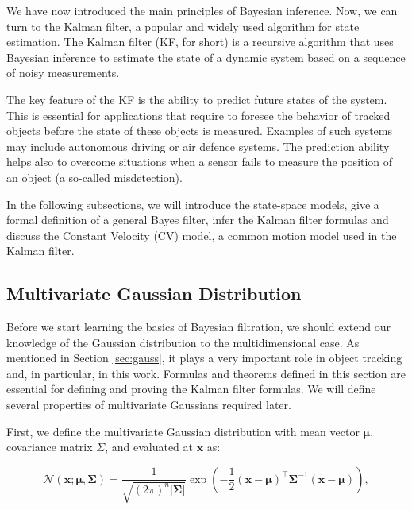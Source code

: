 
We have now introduced the main principles of Bayesian inference. Now, we can
turn to the Kalman filter, a popular and widely used algorithm for state 
estimation. The Kalman filter (KF, for short) is a recursive algorithm that uses
Bayesian inference to estimate the state of a dynamic system based on a sequence
of noisy measurements.

The key feature of the KF is the ability to predict future states of the system.
This is essential for applications that require to foresee the behavior of
tracked objects before the state of these objects is measured. Examples of such
systems may include autonomous driving or air defence systems. The prediction 
ability helps also to overcome situations when a sensor fails to measure the
position of an object (a so-called misdetection).

In the following subsections, we will introduce the state-space models, give
a formal definition of a general Bayes filter, infer the Kalman filter formulas
and discuss the Constant Velocity (CV) model, a common motion model used in the
Kalman filter.

\subsection{Multivariate Gaussian Distribution}

Before we start learning the basics of Bayesian filtration, we should extend our knowledge of the Gaussian distribution to the multidimensional case. As mentioned in Section \ref{sec:gauss}, it plays a very important role in object tracking and, in particular, in this work. Formulas and theorems defined in this section are essential for defining and proving the Kalman filter formulas. We will define several properties of multivariate Gaussians required later.

First, we define the multivariate Gaussian distribution with mean vector $\boldsymbol\mu$, covariance matrix $\Sigma$, and evaluated at $\mathbf{x}$ as:

\begin{equation}\label{eq:vec-gauss-def}
    \mathscr{N}\left(\mathbf{x} ; \mathbf\mu, \mathbf\Sigma\right)
    = \frac{1}{\sqrt{(2\pi)^n|\mathbf{\Sigma}|}}\exp\left(-\frac{1}{2}(\mathbf{x}-\boldsymbol{\mu})^\top \mathbf{\Sigma}^{-1} (\mathbf{x}-\boldsymbol{\mu})\right),
\end{equation}

